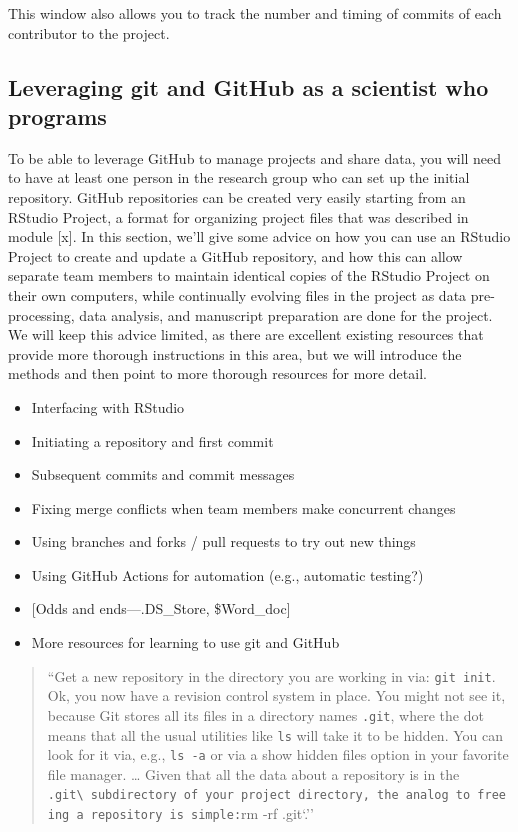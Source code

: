 \documentclass[]{tufte-book}
\providecommand{\tightlist}{%
  \setlength{\itemsep}{0pt}\setlength{\parskip}{0pt}}
\begin{document}
This window also allows you to track the number and timing of commits of each contributor
to the project.

\hypertarget{leveraging-git-and-github-as-a-scientist-who-programs}{%
\subsection{Leveraging git and GitHub as a scientist who programs}\label{leveraging-git-and-github-as-a-scientist-who-programs}}

To be able to leverage GitHub to manage projects and share data, you will
need to have at least one person in the research group who can set up the
initial repository. GitHub repositories can be created very easily starting
from an RStudio Project, a format for organizing project files that was
described in module {[}x{]}. In this section, we'll give some advice on how you
can use an RStudio Project to create and update a GitHub repository, and how
this can allow separate team members to maintain identical copies of the
RStudio Project on their own computers, while continually evolving files in
the project as data pre-processing, data analysis, and manuscript
preparation are done for the project. We will keep this advice limited,
as there are excellent existing resources that provide more thorough
instructions in this area, but we will introduce the methods and then
point to more thorough resources for more detail.

\begin{itemize}
\tightlist
\item
  Interfacing with RStudio
\item
  Initiating a repository and first commit
\item
  Subsequent commits and commit messages
\item
  Fixing merge conflicts when team members make concurrent changes
\item
  Using branches and forks / pull requests to try out new things
\item
  Using GitHub Actions for automation (e.g., automatic testing?)
\item
  {[}Odds and ends---.DS\_Store, \$Word\_doc{]}
\item
  More resources for learning to use git and GitHub
\end{itemize}

\begin{quote}
``Get a new repository in the directory you are working in via: \texttt{git\ init}. Ok, you
now have a revision control system in place. You might not see it, because Git stores
all its files in a directory names \texttt{.git}, where the dot means that all the usual
utilities like \texttt{ls} will take it to be hidden. You can look for it via, e.g.,
\texttt{ls\ -a} or via a show hidden files option in your favorite file manager. \ldots{}
Given that all the data about a repository is in the \texttt{.git\textbackslash{}\ subdirectory\ of\ your\ project\ directory,\ the\ analog\ to\ freeing\ a\ repository\ is\ simple:}rm -rf .git`.''
\citep{klemens201421st}
\end{quote}
\end{document}
